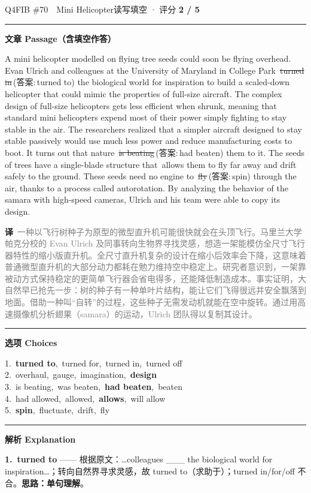 \documentclass[11pt]{article}
\newcommand{\ptesub}[1]{%
  \par\needspace{2\baselineskip}\smallskip
  {\color{cAccent}\rule[-0.2ex]{3pt}{1.05em}}\hspace{6pt}%
  {\bfseries\color{cHead}#1}\par\nopagebreak\smallskip}
\newcommand{\zh}[1]{{\footnotesize\textcolor{cNote}{\textbf{译}}\ \textcolor{gray}{#1}}}
\newcommand{\rok}[1]{{\color{cFix}\ding{51}\,#1}}                 %
\newcommand{\rno}[2]{{\color{cWrong}\ding{55}\,\sout{#1}}\,{\footnotesize\color{cFix}(答案:\,#2)}}  %
\begin{document}
\begin{qblock}{Q4\quad FIB \#70\ \ Mini Helicopter}{读写填空 · 评分 \textcolor{cAccent}{\bfseries 2 / 5}}
\ptesub{文章 Passage（含填空作答）}
\begin{promptbox}
A mini helicopter modelled on flying tree seeds could soon be flying overhead. Evan Ulrich and colleagues at the University of Maryland in College Park \rno{turned in}{turned to} the biological world for inspiration to build a scaled-down helicopter that could mimic the properties of full-size aircraft. The complex \rok{design} of full-size helicopters gets less efficient when shrunk, meaning that standard mini helicopters expend most of their power simply fighting to stay stable in the air. The researchers realized that a simpler aircraft designed to stay stable passively would use much less power and reduce manufacturing costs to boot. It turns out that nature \rno{is beating}{had beaten} them to it. The seeds of trees have a single-blade structure that \rok{allows} them to fly far away and drift safely to the ground. These seeds need no engine to \rno{fly}{spin} through the air, thanks to a process called autorotation. By analyzing the behavior of the samara with high-speed cameras, Ulrich and his team were able to copy its design.
\end{promptbox}
\zh{一种以飞行树种子为原型的微型直升机可能很快就会在头顶飞行。马里兰大学帕克分校的 Evan Ulrich 及同事转向生物界寻找灵感，想造一架能模仿全尺寸飞行器特性的缩小版直升机。全尺寸直升机复杂的设计在缩小后效率会下降，这意味着普通微型直升机的大部分动力都耗在勉力维持空中稳定上。研究者意识到，一架靠被动方式保持稳定的更简单飞行器会省电得多，还能降低制造成本。事实证明，大自然早已抢先一步：树的种子有一种单叶片结构，能让它们飞得很远并安全飘落到地面。借助一种叫“自转”的过程，这些种子无需发动机就能在空中旋转。通过用高速摄像机分析翅果（samara）的运动，Ulrich 团队得以复制其设计。}
\ptesub{选项 Choices}
{\small
1.\ \textbf{turned to},\ turned for,\ turned in,\ turned off\\
2.\ overhaul,\ gauge,\ imagination,\ \textbf{design}\\
3.\ is beating,\ was beaten,\ \textbf{had beaten},\ beaten\\
4.\ had allowed,\ allowed,\ \textbf{allows},\ will allow\\
5.\ \textbf{spin},\ fluctuate,\ drift,\ fly}
\ptesub{解析 Explanation}
\begin{notebox}\footnotesize
\textbf{1.\ turned to} —— 根据原文：…colleagues \_\_\_ the biological world for inspiration…；转向自然界寻求灵感，故 turned to（求助于）；turned in/for/off 不合。\textbf{思路：单句理解}。\\[2pt]

\end{notebox}
\end{qblock}
\end{document}
